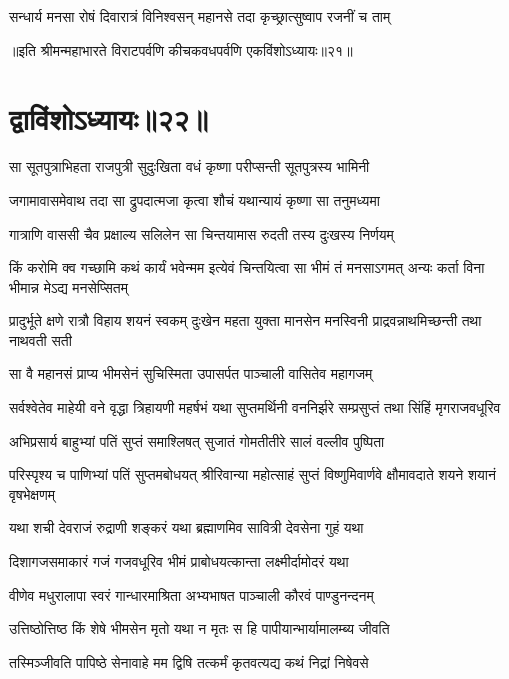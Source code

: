 \twolineshloka
{सन्धार्य मनसा रोषं दिवारात्रं विनिश्वसन्}
{महानसे तदा कृच्छ्रात्सुष्वाप रजनीं च ताम्}

॥इति श्रीमन्महाभारते विराटपर्वणि कीचकवधपर्वणि एकविंशोऽध्यायः॥२१॥

\chapter{द्वाविंशोऽध्यायः॥२२॥}

\twolineshloka
{सा सूतपुत्राभिहता राजपुत्री सुदुःखिता}
{वधं कृष्णा परीप्सन्ती सूतपुत्रस्य भामिनी}


\twolineshloka
{जगामावासमेवाथ तदा सा द्रुपदात्मजा}
{कृत्वा शौचं यथान्यायं कृष्णा सा तनुमध्यमा}


\twolineshloka
{गात्राणि वाससी चैव प्रक्षाल्य सलिलेन सा}
{चिन्तयामास रुदती तस्य दुःखस्य निर्णयम्}


\threelineshloka
{किं करोमि क्व गच्छामि कथं कार्यं भवेन्मम}
{इत्येवं चिन्तयित्वा सा भीमं तं मनसाऽगमत्}
{अन्यः कर्ता विना भीमान्न मेऽद्य मनसेप्सितम्}


\threelineshloka
{प्रादुर्भूते क्षणे रात्रौ विहाय शयनं स्वकम्}
{दुःखेन महता युक्ता मानसेन मनस्विनी}
{प्राद्रवन्नाथमिच्छन्ती तथा नाथवती सती}


\twolineshloka
{सा वै महानसं प्राप्य भीमसेनं सुचिस्मिता}
{उपासर्पत पाञ्चाली वासितेव महागजम्}


\threelineshloka
{सर्वश्वेतेव माहेयी वने वृद्धा त्रिहायणी}
{महर्षभं यथा सुप्तमर्थिनी वननिर्झरे}
{सम्प्रसुप्तं तथा सिंहिं मृगराजवधूरिव}


\twolineshloka
{अभिप्रसार्य बाहुभ्यां पतिं सुप्तं समाश्लिषत्}
{सुजातं गोमतीतीरे सालं वल्लीव पुष्पिता}


\threelineshloka
{परिस्पृश्य च पाणिभ्यां पतिं सुप्तमबोधयत्}
{श्रीरिवान्या महोत्साहं सुप्तं विष्णुमिवार्णवे}
{क्षौमावदाते शयने शयानं वृषभेक्षणम्}


\twolineshloka
{यथा शची देवराजं रुद्राणी शङ्करं यथा}
{ब्रह्माणमिव सावित्री देवसेना गुहं यथा}


\twolineshloka
{दिशागजसमाकारं गजं गजवधूरिव}
{भीमं प्राबोधयत्कान्ता लक्ष्मीर्दामोदरं यथा}


\twolineshloka
{वीणेव मधुरालापा स्वरं गान्धारमाश्रिता}
{अभ्यभाषत पाञ्चाली कौरवं पाण्डुनन्दनम्}


\twolineshloka
{उत्तिष्ठोत्तिष्ठ किं शेषे भीमसेन मृतो यथा}
{न मृतः स हि पापीयान्भार्यामालम्ब्य जीवति}


\twolineshloka
{तस्मिञ्जीवति पापिष्ठे सेनावाहे मम द्विषि}
{तत्कर्मं कृतवत्यद्य कथं निद्रां निषेवसे}


